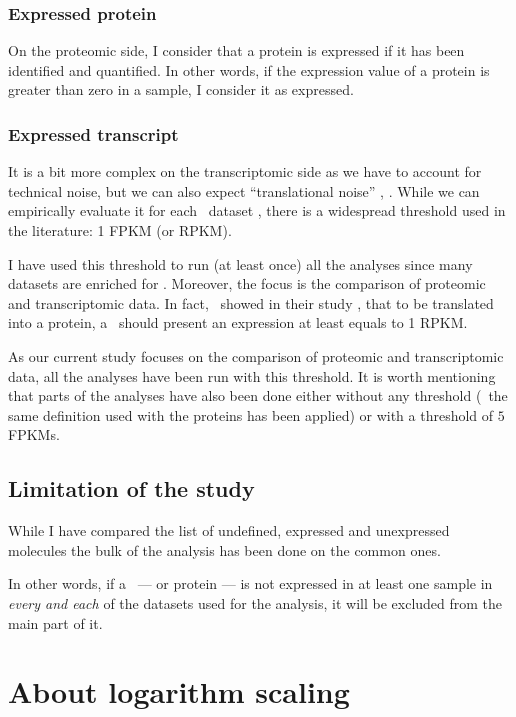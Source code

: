 \subsubsection{Expressed protein}
On the proteomic side, I consider that a protein is expressed if it has been
identified and quantified. In other words, if the expression value of a protein
is greater than zero in a sample, I consider it as expressed.

\subsubsection{Expressed transcript}\label{subsubsec:exprTrans}
It is a bit more complex on the transcriptomic side as we have to account for
technical noise, but we can also expect ``translational noise'' \citep{rnaseq-2009},
\citep{lowNoiseLimit}.
While we can empirically evaluate it for each \Rnaseq\ dataset \citep{ramskoldan:2009},
there is a widespread threshold used in the literature:
1 \gls{FPKM} (or \gls{RPKM}).

I have used this threshold to run (at least once) all the analyses since
many datasets are enriched for \mRNAs. Moreover, the 
focus is the comparison of proteomic and
transcriptomic data. In fact,~\citet{Hebenstreit:2011} showed in their study
, that to be translated into a protein,
a \mRNA\ should present an expression at least equals to 1 \gls{RPKM}.

As our current study focuses on the comparison of proteomic and transcriptomic
data, all the analyses have been run with this threshold. It is worth mentioning
that parts of the analyses have also been done either without
any threshold (\ie\ the same definition used with the proteins has been applied)
or with a threshold of $5$ \glspl{FPKM}.

\subsection{Limitation of the study}
While I have compared the list of undefined, expressed and unexpressed molecules
the bulk of the analysis has been done on the common ones.

In other words, if a \mRNA\ --- or protein --- is not expressed in at least
one sample in \emph{every and each} of the datasets used for the analysis,
it will be excluded from the main part of it.


\section{About logarithm scaling}




